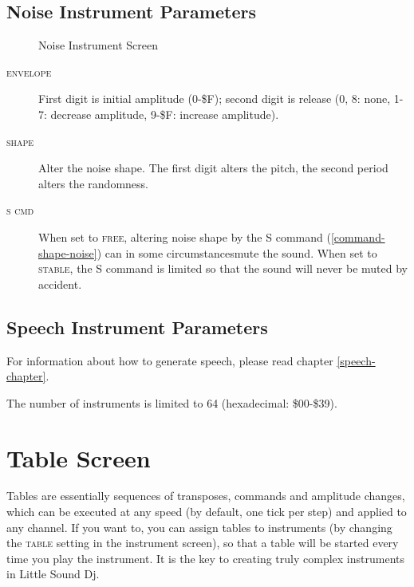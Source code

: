 \subsection{Noise Instrument Parameters}

\begin{figure}[htpb]
	\begin{center}
	\end{center}
	\caption{Noise Instrument Screen}
	\label{fig:instr-noise}
\end{figure}

\begin{description}
	\item[\textsc{envelope}] First digit is initial amplitude (0-\$F); second digit is release (0, 8: none, 1-7: decrease amplitude, 9-\$F: increase amplitude).
	\item[\textsc{shape}] Alter the noise shape. The first digit alters the pitch, the second
period alters the randomness.
	\item[\textsc{s cmd}] When set to \textsc{free}, altering noise shape by the \textsc{S}
command (\ref{command-shape-noise}) can in some circumstances\footnotemark mute the sound. When set to \textsc{stable}, the
\textsc{S} command is limited so that the sound will never be muted by accident.
\end{description}

\subsection{Speech Instrument Parameters}

For information about how to generate speech, please read chapter \ref{speech-chapter}.

The number of instruments is limited to 64 (hexadecimal: \$00-\$39).

\section{Table Screen}

Tables are essentially sequences of transposes, commands and amplitude changes, which can be executed at any speed (by default, one tick per step) and applied to any channel. If you want to, you can assign tables to instruments (by changing the \textsc{table} setting in the instrument screen), so that a table will be started every time you play the instrument. It is the key to creating truly complex instruments in Little Sound Dj.

